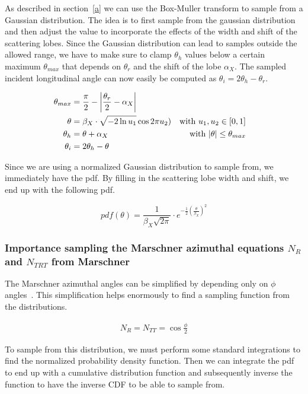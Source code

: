 \documentclass[12pt,a4paper,twoside]{article}
\begin{document}
As described in section~\ref{a} we can use the Box-Muller transform to sample from a Gaussian distribution. The idea is to first sample from the gaussian distribution and then adjust the value to incorporate the effects of the width and shift of the scattering lobes. Since the Gaussian distribution can lead to samples outside the allowed range, we have to make sure to clamp $\theta_h$ values below a certain maximum $\theta_{max}$ that depends on $\theta_r$ and the shift of the lobe $\alpha_X$. The sampled incident longitudinal angle can now easily be computed as $\theta_i = 2\theta_h - \theta_r$.

\begin{align}
\theta_{max} & = \frac{\pi}{2} - \left| \frac{\theta_r}{2} - \alpha_X\right| \\
\theta & = \beta_{X} \cdot \sqrt{-2 \ln u_1} \cos 2\pi u_2) & \textnormal{with $u_1, u_2 \in [0, 1]$}  \\
\theta_h & = \theta + \alpha_X & \textnormal{with $\left|\theta\right| \leq \theta_{max}$}\\
\theta_i & = 2 \theta_h - \theta &&
\end{align}

Since we are using a normalized Gaussian distribution to sample from, we immediately have the pdf. By filling in the scattering lobe width and shift, we end up with the following pdf.

\begin{equation}
pdf(\theta) = \frac{1}{\beta_{X} \sqrt{2\pi}} \cdot e^{-\frac{1}{2}(\frac{\theta}{\beta_{X}})^2}
\end{equation}

\subsubsection*{Importance sampling the Marschner azimuthal equations $N_R$ and $N_{TRT}$ from Marschner}

The Marschner azimuthal angles can be simplified by depending only on $\phi$ angles~\cite{sadeghi:10}. This simplification helps enormously to find a sampling function from the distributions.

\begin{align}
N_R = N_{TT} = \cos \frac{\phi}{2}
\end{align}

To sample from this distribution, we must perform some standard integrations to find the normalized probability density function. Then we can integrate the pdf to end up with a cumulative distribution function and subsequently inverse the function to have the inverse CDF to be able to sample from.
\end{document}
